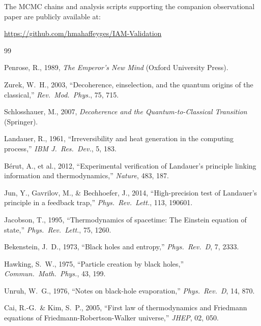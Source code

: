 \documentclass[11pt]{article}
\begin{document}
The MCMC chains and analysis scripts supporting the companion observational
paper are publicly available at:

\url{https://github.com/hmahaffeyges/IAM-Validation}



\begin{thebibliography}{99}

Penrose, R., 1989, \textit{The Emperor's New Mind} (Oxford University Press).

Zurek, W.~H., 2003, ``Decoherence, einselection, and the quantum origins of
the classical,'' \textit{Rev.\ Mod.\ Phys.}, 75, 715.

Schlosshauer, M., 2007, \textit{Decoherence and the Quantum-to-Classical
Transition} (Springer).

Landauer, R., 1961, ``Irreversibility and heat generation in the computing
process,'' \textit{IBM J.\ Res.\ Dev.}, 5, 183.

B\'{e}rut, A., et al., 2012, ``Experimental verification of Landauer's
principle linking information and thermodynamics,'' \textit{Nature}, 483, 187.

Jun, Y., Gavrilov, M., \& Bechhoefer, J., 2014, ``High-precision test of
Landauer's principle in a feedback trap,'' \textit{Phys.\ Rev.\ Lett.},
113, 190601.

Jacobson, T., 1995, ``Thermodynamics of spacetime: The Einstein equation of
state,'' \textit{Phys.\ Rev.\ Lett.}, 75, 1260.

Bekenstein, J.~D., 1973, ``Black holes and entropy,'' \textit{Phys.\ Rev.\
D}, 7, 2333.

Hawking, S.~W., 1975, ``Particle creation by black holes,''
\textit{Commun.\ Math.\ Phys.}, 43, 199.

Unruh, W.~G., 1976, ``Notes on black-hole evaporation,'' \textit{Phys.\
Rev.\ D}, 14, 870.

Cai, R.-G.\ \& Kim, S.~P., 2005, ``First law of thermodynamics and
Friedmann equations of Friedmann-Robertson-Walker universe,'' \textit{JHEP},
02, 050.


\end{thebibliography}
\end{document}
